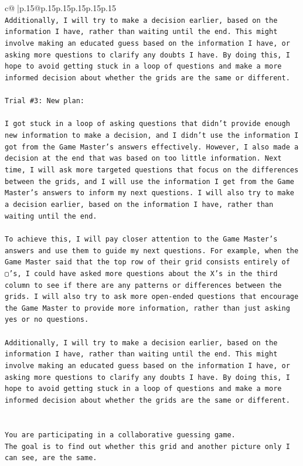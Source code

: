 \documentclass{article}
\begin{document}
{\begin{supertabular}{c@{$\;$}|p{.15\linewidth}@{}p{.15\linewidth}p{.15\linewidth}p{.15\linewidth}p{.15\linewidth}p{.15\linewidth}}
{{{\\ 
\texttt{Additionally, I will try to make a decision earlier, based on the information I have, rather than waiting until the end. This might involve making an educated guess based on the information I have, or asking more questions to clarify any doubts I have. By doing this, I hope to avoid getting stuck in a loop of questions and make a more informed decision about whether the grids are the same or different.} \\
\\ 
\texttt{Trial \#3: New plan: } \\
\\ 
\texttt{I got stuck in a loop of asking questions that didn't provide enough new information to make a decision, and I didn't use the information I got from the Game Master's answers effectively. However, I also made a decision at the end that was based on too little information. Next time, I will ask more targeted questions that focus on the differences between the grids, and I will use the information I get from the Game Master's answers to inform my next questions. I will also try to make a decision earlier, based on the information I have, rather than waiting until the end. } \\
\\ 
\texttt{To achieve this, I will pay closer attention to the Game Master's answers and use them to guide my next questions. For example, when the Game Master said that the top row of their grid consists entirely of ▢'s, I could have asked more questions about the X's in the third column to see if there are any patterns or differences between the grids. I will also try to ask more open{-}ended questions that encourage the Game Master to provide more information, rather than just asking yes or no questions. } \\
\\ 
\texttt{Additionally, I will try to make a decision earlier, based on the information I have, rather than waiting until the end. This might involve making an educated guess based on the information I have, or asking more questions to clarify any doubts I have. By doing this, I hope to avoid getting stuck in a loop of questions and make a more informed decision about whether the grids are the same or different.} \\
\\ 
\\ 
\texttt{You are participating in a collaborative guessing game.} \\
\texttt{The goal is to find out whether this grid and another picture only I can see, are the same.} \\
}}}
\end{supertabular}}
\end{document}
